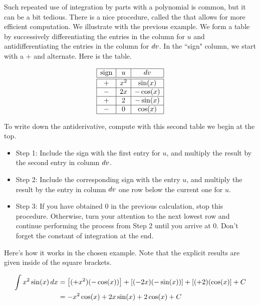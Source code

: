 \documentclass[noauthor]{ximera}
\begin{document}
\begin{remark}
Such repeated use of integration by parts with a polynomial is common, but 
it can be a bit tedious. There is a nice procedure, called the  that allows for more efficient computation.  We illustrate with the 
previous example.  We form a table by successively differentiating the entries 
in the column for $u$ and antidifferentiating the entries in the column for $\mathop{}\!d v$.  
In the ``sign" column, we start with a $+$ and alternate.  Here is the table.

\[
\begin{array}{|c|c|c|}\hline
\text{sign} & u & \mathop{}\!d v \\ \hline \hline
+ & x^2 & \sin(x) \\ \hline
- & 2x & -\cos(x) \\ \hline
 + & 2  & -\sin(x) \\ \hline
- & 0  & \cos(x) \\ \hline
\end{array}
\]

To write down the antiderivative, compute with this second table we begin at the top. 

\begin{itemize}
\item Step 1: Include the sign with the first entry for $u$, and multiply the result by the second entry in column $\mathop{}\!d v$.  
\item Step 2: Include the corresponding sign with the entry $u$, and multiply the result by the entry in column $\mathop{}\!d v$ one row below the current one for $u$.  
\item Step 3: If you have obtained 0 in the previous calculation, stop this procedure. Otherwise, turn your attention to the next lowest row and continue performing the process from Step 2 until you arrive at 0.  Don't forget the constant of integration at the end.
\end{itemize}

Here's how it works in the chosen example.  Note that the explicit results are given inside of the square brackets.

\begin{align*}
\int x^2 \sin(x) \mathop{}\!d x &= \left[(+x^2)(-\cos(x))\right] + \left[(-2x)(-\sin(x)) \right] +\left[(+2)(\cos(x)\right] + C\\
&= -x^2 \cos(x) +2x\sin(x)+2\cos(x) +C
\end{align*}

\end{remark}
\end{document}
